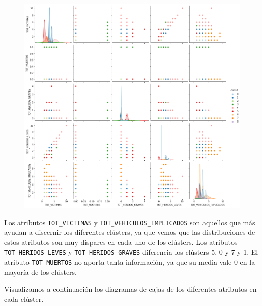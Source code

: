 \documentclass[a4]{article}
\begin{document}
\begin{figure}[H]
  \centering
  \includegraphics[width=180mm]{imagenes/c2_kmeans_pairplot}
\end{figure}

Los atributos \texttt{TOT\_VICTIMAS} y \texttt{TOT\_VEHICULOS\_IMPLICADOS} son aquellos que más ayudan a discernir los diferentes clústers, ya que vemos que las distribuciones de estos atributos son muy dispares en cada uno de los clústers. Los atributos \texttt{TOT\_HERIDOS\_LEVES} y \texttt{TOT\_HERIDOS\_GRAVES} diferencia los clústers 5, 0 y 7 y 1. El atributo \texttt{TOT\_MUERTOS} no aporta tanta información, ya que su media vale 0 en la mayoría de los clústers.

\newpage
Visualizamos a continuación los diagramas de cajas de los diferentes atributos en cada clúster.
\end{document}
